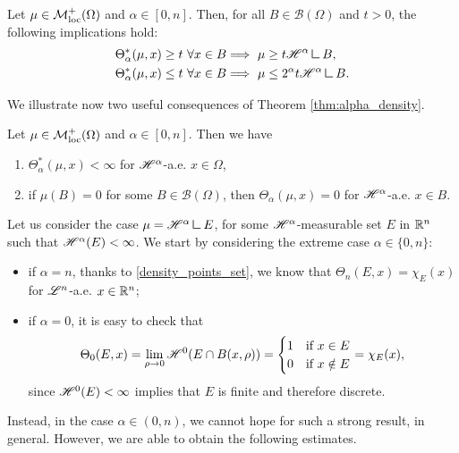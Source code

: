 \begin{theorem} \label{thm:alpha_density}
Let $\mu \in \mathcal{M}^{+}_{\rm loc}(\Omega)$ and $\alpha \in [0, n]$. Then, for all $B \in \mathcal{B}(\Omega)$ and $t > 0$, the following implications hold:
\begin{align}
\Theta^{*}_{\alpha}(\mu, x) \ge t \ \forall x \in B & \Longrightarrow \ \mu \ge t \Haus{\alpha} \res B, \label{eq:lower_bound_density} \\
\Theta^{*}_{\alpha}(\mu, x) \le t \ \forall x \in B & \Longrightarrow \ \mu \le 2^{\alpha} t \Haus{\alpha} \res B. \label{eq:upper_bound_density}
\end{align}
\end{theorem}

We illustrate now two useful consequences of Theorem \ref{thm:alpha_density}.

\begin{corollary}
Let $\mu \in \mathcal{M}^{+}_{\rm loc}(\Omega)$ and $\alpha \in [0, n]$. Then we have
\begin{enumerate}
\item $\Theta^{*}_{\alpha}(\mu, x) < \infty$ for $\mathscr{H}^{\alpha}$-a.e. $x \in \Omega$,
\item if $\mu(B) = 0$ for some $B \in \mathcal{B}(\Omega)$, then $\Theta_{\alpha}(\mu, x) = 0$ for $\mathscr{H}^{\alpha}$-a.e. $x \in B$.
\end{enumerate}
\end{corollary}

Let us consider the case $\mu = \Haus{\alpha} \res E$, for some $\mathscr{H}^{\alpha}$-measurable set $E$ in $\mathbb{R}^{n}$ such that $\mathscr{H}^{\alpha}(E) < \infty$. We start by considering the extreme case $\alpha \in \{0, n\}$:
\begin{itemize}
\item if $\alpha = n$, thanks to \eqref{density_points_set}, we know that $\Theta_{n}(E, x) = \chi_{E}(x)$ for $\mathscr{L}^{n}$-a.e. $x \in \mathbb{R}^{n}$; 
\item if $\alpha = 0$, it is easy to check that
\begin{equation*}
\Theta_{0}(E, x) = \lim_{\rho \to 0} \mathscr{H}^{0}(E \cap B(x, \rho)) = \begin{cases} 1 & \text{if} \ x \in E \\
0 & \text{if} \ x \notin E
\end{cases} = \chi_{E}(x),
\end{equation*} 
since $\mathscr{H}^{0}(E) < \infty$ implies that $E$ is finite and therefore discrete.
\end{itemize}
Instead, in the case $\alpha \in (0, n)$, we cannot hope for such a strong result, in general. However, we are able to obtain the following estimates.

